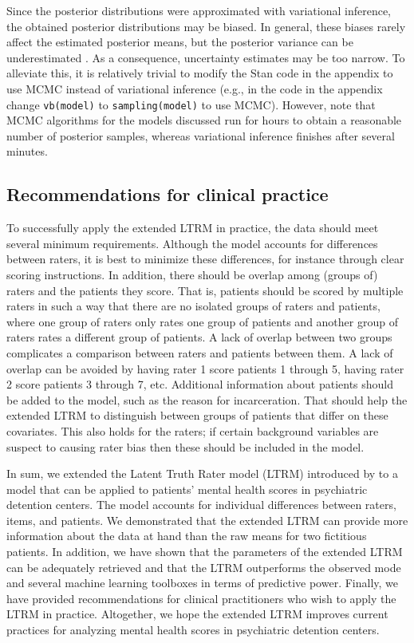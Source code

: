 \documentclass[a4paper]{article}
\newcommand{\code}[1]{\texttt{#1}}
\begin{document}
Since the posterior distributions were approximated with variational inference, the obtained posterior distributions may be biased. In general, these biases rarely affect the estimated posterior means, but the posterior variance can be underestimated \cite{blei2017variational}. As a consequence, uncertainty estimates may be too narrow. To alleviate this, it is relatively trivial to modify the Stan code in the appendix to use MCMC instead of variational inference (e.g., in the code in the appendix change \code{vb(model)} to \code{sampling(model)} to use MCMC). However, note that MCMC algorithms for the models discussed run for hours to obtain a reasonable number of posterior samples, whereas variational inference finishes after several minutes.

\subsection*{Recommendations for clinical practice}
To successfully apply the extended LTRM in practice, the data should meet several minimum requirements. %
Although the model accounts for differences between raters, it is best to minimize these differences, for instance through clear scoring instructions. In addition, there should be overlap among (groups of) raters and the patients they score. That is, patients should be scored by multiple raters in such a way that there are no isolated groups of raters and patients, where one group of raters only rates one group of patients and another group of raters rates a different group of patients. A lack of overlap between two groups complicates a comparison between raters and patients between them. A lack of overlap can be avoided by having rater 1 score patients 1 through 5, having rater 2 score patients 3 through 7, etc. Additional information about patients should be added to the model, such as the reason for incarceration. That should help the extended LTRM to distinguish between groups of patients that differ on these covariates. This also holds for the raters; if certain background variables are suspect to causing rater bias then these should be included in the model.

In sum, we extended the Latent Truth Rater model (LTRM) introduced by  to a model that can be applied to patients' mental health scores in psychiatric detention centers. The model accounts for individual differences between raters, items, and patients. We demonstrated that the extended LTRM can provide more information about the data at hand than the raw means for two fictitious patients. In addition, we have shown that the parameters of the extended LTRM can be adequately retrieved and that the LTRM outperforms the observed mode and several machine learning toolboxes in terms of predictive power. Finally, we have provided recommendations for clinical practitioners who wish to apply the LTRM in practice. Altogether, we hope the extended LTRM improves current practices for analyzing mental health scores in psychiatric detention centers. 
\end{document}
